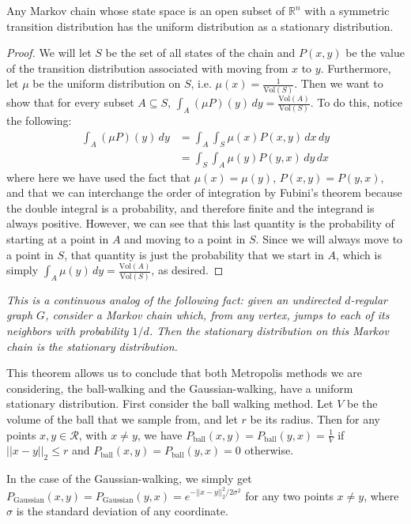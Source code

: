 \documentclass[11pt]{article}
\begin{document}
\begin{theorem}
Any Markov chain whose state space is an open subset of $\mathbb{R}^n$ with a symmetric transition distribution has the uniform distribution as a stationary distribution.
\end{theorem}
\begin{proof}
We will let $S$ be the set of all states of the chain and $P(x,y)$ be the value of the transition distribution associated with moving from $x$ to $y$. Furthermore, let $\mu$ be the uniform distribution on $S$, i.e. $\mu(x) = \frac{1}{\text{Vol}(S)}$. Then we want to show that for every subset $A \subseteq S$, $\int_A (\mu P)(y)\, dy = \frac{\text{Vol}(A)}{\text{Vol}(S)}$. To do this, notice the following:
\begin{align*}
\int_A (\mu P)(y)\, dy &= \int_A \int_S \mu(x)P(x,y)\, dx\, dy \\
&= \int_S \int_A \mu(y)P(y,x)\, dy\, dx
\end{align*}
where here we have used the fact that $\mu(x) = \mu(y)$, $P(x,y) = P(y,x)$, and that we can interchange the order of integration by Fubini's theorem because the double integral is a probability, and therefore finite and the integrand is always positive. However, we can see that this last quantity is the probability of starting at a point in $A$ and moving to a point in $S$. Since we will always move to a point in $S$, that quantity is just the probability that we start in $A$, which is simply $\int_A \mu(y)\, dy = \frac{\text{Vol}(A)}{\text{Vol}(S)}$, as desired.
\end{proof}
\begin{remark} 
\emph{This is a continuous analog of the following fact: given an undirected $d$-regular graph $G$, consider a Markov chain which, from any vertex, jumps to each of its neighbors with probability $1/d$. Then the stationary distribution on this Markov chain is the stationary distribution.}
\end{remark}

This theorem allows us to conclude that both Metropolis methods we are considering, the ball-walking and the Gaussian-walking, have a uniform stationary distribution. First consider the ball walking method. Let $V$ be the volume of the ball that we sample from, and let $r$ be its radius. Then for any points $x,y\in\mathcal{R}$, with $x\ne y$, we have $P_\text{ball}(x,y) = P_\text{ball}(y,x) = \frac{1}{V}$ if $||x-y||_2 \le r$ and $P_\text{ball}(x,y) = P_\text{ball}(y,x) = 0$ otherwise.

In the case of the Gaussian-walking, we simply get $P_\text{Gaussian}(x,y) = P_\text{Gaussian}(y,x) = e^{-||x-y||_2^2 / 2\sigma^2}$ for any two points $x\ne y$, where $\sigma$ is the standard deviation of any coordinate.
\end{document}
